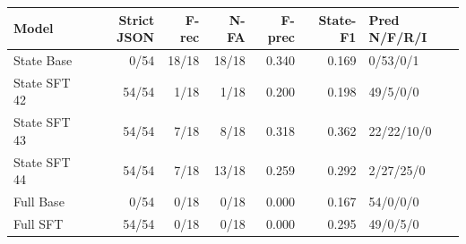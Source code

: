 \begin{tabular}{lrrrrrl}
\toprule
Model & Strict JSON & F-rec & N-FA & F-prec & State-F1 & Pred N/F/R/I \\
\midrule
State Base & 0/54 & 18/18 & 18/18 & 0.340 & 0.169 & 0/53/0/1 \\
State SFT 42 & 54/54 & 1/18 & 1/18 & 0.200 & 0.198 & 49/5/0/0 \\
State SFT 43 & 54/54 & 7/18 & 8/18 & 0.318 & 0.362 & 22/22/10/0 \\
State SFT 44 & 54/54 & 7/18 & 13/18 & 0.259 & 0.292 & 2/27/25/0 \\
Full Base & 0/54 & 0/18 & 0/18 & 0.000 & 0.167 & 54/0/0/0 \\
Full SFT & 54/54 & 0/18 & 0/18 & 0.000 & 0.295 & 49/0/5/0 \\
\bottomrule
\end{tabular}
